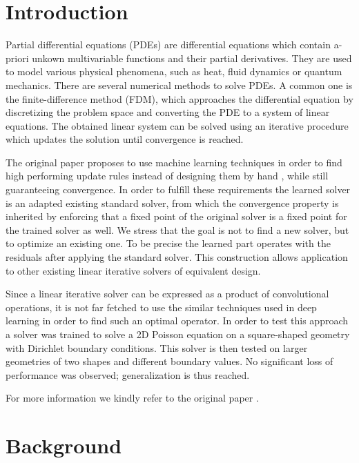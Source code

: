 \vspace{-2em}

\section{Introduction}

Partial differential equations (PDEs) are differential equations which contain a-priori unkown multivariable functions and their partial derivatives. They are used to model various physical phenomena, such as heat, fluid dynamics or quantum mechanics. There are several numerical methods to solve PDEs. A common one is the finite-difference method (FDM), which approaches the differential equation by discretizing the problem space and converting the PDE to a system of linear equations. The obtained linear system can be solved using an iterative procedure which updates the solution until convergence is reached.

The original paper proposes to use machine learning techniques in order to find high performing update rules instead of designing them by hand \cite{original_paper}, while still guaranteeing convergence.  
In order to fulfill these requirements the learned solver is an adapted existing standard solver, from which the convergence property is inherited by enforcing that a fixed point of the original solver is a fixed point for the trained solver as well. We stress that the goal is not to find a new solver, but to optimize an existing one. To be precise the learned part operates with the residuals after applying the standard solver. This construction allows application to other existing linear iterative solvers of equivalent design.

Since a linear iterative solver can be expressed as a product of convolutional operations, it is not far fetched to use the similar techniques used in deep learning in order to find such an optimal operator.
In order to test this approach a solver was trained to solve a 2D Poisson equation on a square-shaped geometry with Dirichlet boundary conditions. This solver is then tested on larger geometries of two shapes and different boundary values. No significant loss of performance was observed; generalization is thus reached.

For more information we kindly refer to the original paper \cite{original_paper}.

\section{Background}

